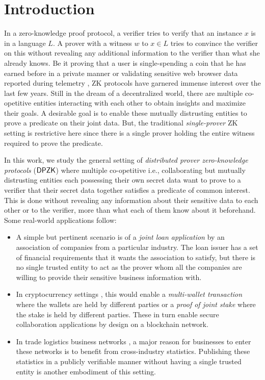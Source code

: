 \section{Introduction} \label{sec:intro}
In a zero-knowledge proof protocol, a verifier tries to verify that an instance $x$ is in a language $L$. A prover with a witness $w$ to $x \in L$ tries to convince the verifier on this without revealing any additional information to the verifier than what she already knows. Be it proving that a user is single-spending a coin that he has earned before in a private manner \cite{zerocash} or validating sensitive web browser data reported during telemetry \cite{MozillaPrio}, ZK protocols have garnered immense interest over the last few years. Still in the dream of a decentralized world, there are multiple co-opetitive entities interacting with each other to obtain insights and maximize their goals. A desirable goal is to enable these mutually distrusting entities to prove a predicate on their joint data. But, the traditional \textit{single-prover} ZK setting is restrictive here since there is a single prover holding the entire witness required to prove the predicate. 

In this work, we study the general setting of \textit{distributed prover zero-knowledge protocols} ($\mathsf{DPZK}$) where multiple co-opetitive i.e., collaborating but mutually distrusting entities each possessing their own secret data want to prove to a verifier that their secret data together satisfies a predicate of common interest. This is done without revealing any information about their sensitive data to each other or to the verifier, more than what each of them know about it beforehand. Some real-world applications follow:
\begin{itemize}
\item A simple but pertinent scenario is of a \textit{joint loan application} by an association of companies from a particular industry. The loan issuer has a set of financial requirements that it wants the association to satisfy, but there is no single trusted entity to act as the prover whom all the companies are willing to provide their sensitive business information with.
\item In cryptocurrency settings \cite{bitcoin, ethereum, zerocash}, this would enable a \textit{multi-wallet transaction} where the wallets are held by different parties or a \textit{proof of joint stake} where the stake is held by different parties. These in turn enable secure collaboration applications by design on a blockchain network. %
\item In trade logistics business networks \cite{scbn, e2open, tradelens}, a major reason for businesses to enter these networks is to benefit from cross-industry statistics. Publishing these statistics in a publicly verifiable manner without having a single trusted entity is another embodiment of this setting.
\end{itemize}


